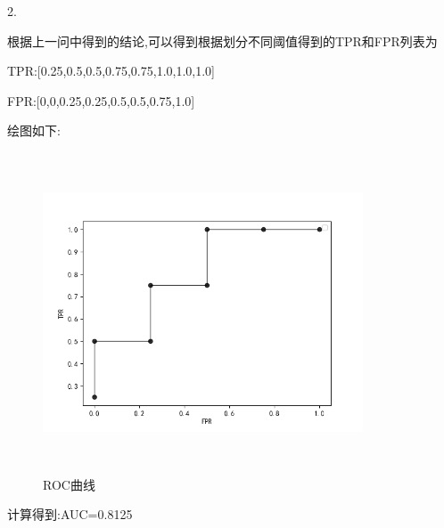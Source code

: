 \documentclass[answers]{exam}  %
\begin{document}
\begin{questions}
\begin{solution}
        2.

        根据上一问中得到的结论,可以得到根据划分不同阈值得到的TPR和FPR列表为

        TPR:[0.25,0.5,0.5,0.75,0.75,1.0,1.0,1.0]

        FPR:[0,0,0.25,0.25,0.5,0.5,0.75,1.0]

        绘图如下:

        \begin{figure}[H]
            \centering
            \includegraphics[width=9.5cm,height=9.5cm]{Figure_2.png}
            \caption{ROC曲线}
        \end{figure}
        计算得到:AUC=0.8125
    \end{solution}
\end{questions}
\end{document}
